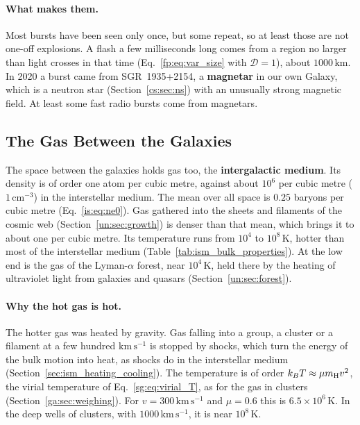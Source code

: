 \paragraph{What makes them.} Most bursts have been seen only once, but some repeat, so at least those are not one-off explosions. A flash a few milliseconds long comes from a region no larger than light crosses in that time (Eq.~\eqref{fp:eq:var_size} with $\mathcal D=1$), about $1000\,\mathrm{km}$. In 2020 a burst came from SGR~1935+2154, a \textbf{magnetar} in our own Galaxy, which is a neutron star (Section~\ref{cs:sec:ns}) with an unusually strong magnetic field. At least some fast radio bursts come from magnetars.

\subsection{The Gas Between the Galaxies}
\label{is:sec:igm}

The space between the galaxies holds gas too, the \textbf{intergalactic medium}. Its density is of order one atom per cubic metre, against about $10^6$ per cubic metre ($1\,\mathrm{cm^{-3}}$) in the interstellar medium. The mean over all space is $0.25$ baryons per cubic metre (Eq.~\eqref{is:eq:ne0}). Gas gathered into the sheets and filaments of the cosmic web (Section~\ref{un:sec:growth}) is denser than that mean, which brings it to about one per cubic metre. Its temperature runs from $10^4$ to $10^8\,\mathrm K$, hotter than most of the interstellar medium (Table~\ref{tab:ism_bulk_properties}). At the low end is the gas of the Lyman-$\alpha$ forest, near $10^4\,\mathrm K$, held there by the heating of ultraviolet light from galaxies and quasars (Section~\ref{un:sec:forest}).

\paragraph{Why the hot gas is hot.} The hotter gas was heated by gravity. Gas falling into a group, a cluster or a filament at a few hundred $\mathrm{km\,s^{-1}}$ is stopped by shocks, which turn the energy of the bulk motion into heat, as shocks do in the interstellar medium (Section~\ref{sec:ism_heating_cooling}). The temperature is of order $k_BT\approx\mu m_{\rm H}v^2$, the virial temperature of Eq.~\eqref{sg:eq:virial_T}, as for the gas in clusters (Section~\ref{ga:sec:weighing}). For $v=300\,\mathrm{km\,s^{-1}}$ and $\mu=0.6$ this is $6.5\times10^6\,\mathrm K$. In the deep wells of clusters, with $1000\,\mathrm{km\,s^{-1}}$, it is near $10^8\,\mathrm K$.

